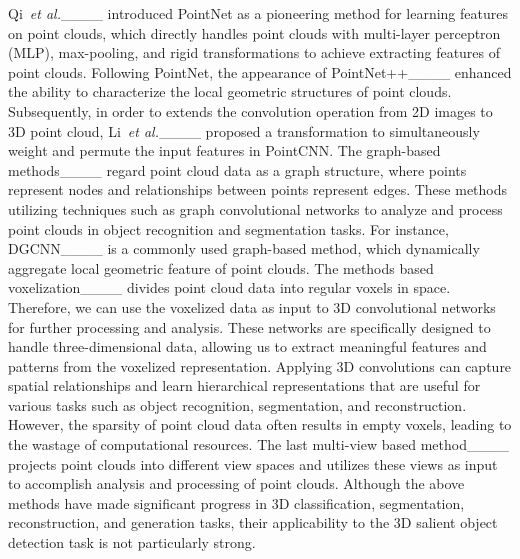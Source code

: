 Qi~\emph{et al.}____ introduced PointNet as a pioneering method for learning features on point clouds, which directly handles point clouds with multi-layer perceptron (MLP), max-pooling, and rigid transformations to achieve extracting features of point clouds. Following PointNet, the appearance of PointNet++____ enhanced the ability to characterize the local geometric structures of point clouds. Subsequently, in order to extends the convolution operation from 2D images to 3D point cloud, Li~\emph{et al.}____ proposed a transformation to simultaneously weight and permute the input features in PointCNN. The graph-based methods____ regard point cloud data as a graph structure, where points represent nodes and relationships between points represent edges. These methods utilizing techniques such as graph convolutional networks to analyze and process point clouds in object recognition and segmentation tasks. For instance, DGCNN____ is a commonly used graph-based method, which dynamically aggregate local geometric feature of point clouds. The methods based voxelization____ divides point cloud data into regular voxels in space. Therefore, we can use the voxelized data as input to 3D convolutional networks for further processing and analysis. These networks are specifically designed to handle three-dimensional data, allowing us to extract meaningful features and patterns from the voxelized representation. Applying 3D convolutions can capture spatial relationships and learn hierarchical representations that are useful for various tasks such as object recognition, segmentation, and reconstruction. However, the sparsity of point cloud data often results in empty voxels, leading to the wastage of computational resources. The last multi-view based method____ projects point clouds into different view spaces and utilizes these views as input to accomplish analysis and processing of point clouds. Although the above methods have made significant progress in 3D classification, segmentation, reconstruction, and generation tasks, their applicability to the 3D salient object detection task is not particularly strong.

